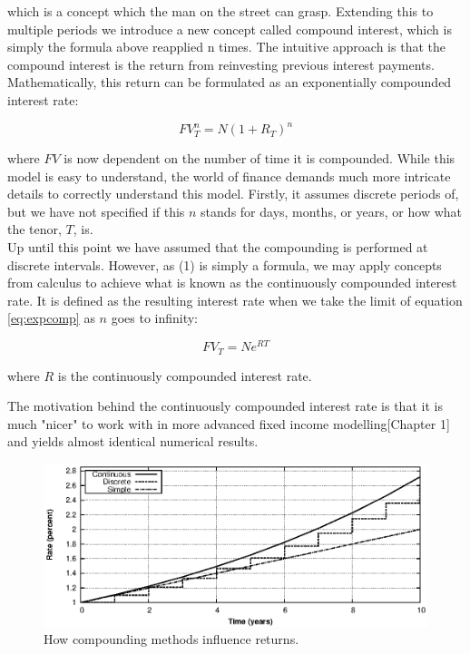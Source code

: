 which is a concept which the man on the street can grasp. Extending this to 
multiple periods we introduce a new concept called compound interest, which is 
simply the formula above reapplied n times. The intuitive approach is that the 
compound interest is the return from reinvesting previous interest payments. 
Mathematically, this return can be formulated as an exponentially compounded 
interest rate:

\begin{equation}\label{eq:expcomp}
FV_T^n = N (1 + R_T)^n
\end{equation}

where $FV$ is now dependent on the number of time it is compounded.
While this model is easy to understand, the world of finance demands much more 
intricate details to correctly understand this model. Firstly, it assumes 
discrete periods of, but we have not specified if this $n$ stands for days, months, 
or years, or how what the tenor, $T$, is.\\

Up until this point we have assumed that the compounding is performed at 
discrete intervals. However, as (1) is simply a formula, we may apply concepts 
from calculus to achieve what is known as the continuously compounded interest 
rate. It is defined as the resulting interest rate when we take the limit of 
equation \ref{eq:expcomp} as $n$ goes to infinity:

\begin{equation}\label{eq:expcomp}
FV_T = N e^{RT}
\end{equation}

where $R$ is the continuously compounded interest rate.

The motivation behind the continuously compounded interest rate is that it is much
"nicer" to work with in more advanced fixed income modelling\cite{cmunk}[Chapter 1]
and yields almost identical numerical results.\\

\begin{figure}[!htb]
\centering
\includegraphics[scale=.7]{images/comp02.eps}
\caption{How compounding methods influence returns.}
\label{fig:comp02}
\end{figure}


